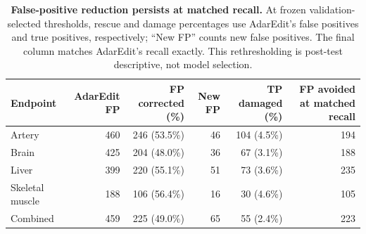 \begin{table}[H]
\centering
\caption{\textbf{False-positive reduction persists at matched recall.} At frozen validation-selected thresholds, rescue and damage percentages use AdarEdit's false positives and true positives, respectively; ``New FP'' counts new false positives. The final column matches AdarEdit's recall exactly. This rethresholding is post-test descriptive, not model selection.}\label{tab:falsepositives}
\begin{tabular}{lrrrrr}
\toprule
Endpoint & AdarEdit FP & FP corrected (\%) & New FP & TP damaged (\%) & FP avoided at matched recall \\
\midrule
Artery & 460 & 246 (53.5\%) & 46 & 104 (4.5\%) & 194 \\
Brain & 425 & 204 (48.0\%) & 36 & 67 (3.1\%) & 188 \\
Liver & 399 & 220 (55.1\%) & 51 & 73 (3.6\%) & 235 \\
Skeletal muscle & 188 & 106 (56.4\%) & 16 & 30 (4.6\%) & 105 \\
Combined & 459 & 225 (49.0\%) & 65 & 55 (2.4\%) & 223 \\
\bottomrule
\end{tabular}
\end{table}
